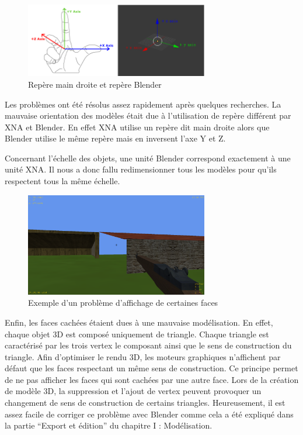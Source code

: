 \documentclass[11pt]{report}
\begin{document}
\begin{figure}[htbp]
\centering
\includegraphics[width=8cm]{repere.png}
\caption{Repère main droite et repère Blender}
\end{figure}

Les problèmes ont été résolus assez rapidement après quelques recherches. La mauvaise orientation des modèles était due à l'utilisation de repère différent par XNA et Blender. En effet XNA utilise un repère dit main droite alors que Blender utilise le même repère mais en inversent l'axe Y et Z.

Concernant l’échelle des objets, une unité Blender correspond exactement à une unité XNA. Il nous a donc fallu redimensionner tous les modèles pour qu'ils respectent tous la même échelle.

\begin{figure}[htbp]
\centering
\includegraphics[width=8cm]{bug-affichage.png}
\caption{Exemple d'un problème d'affichage de certaines faces}
\end{figure}

Enfin, les faces cachées étaient dues à une mauvaise modélisation. En effet, chaque objet 3D est composé uniquement de triangle. Chaque triangle est caractérisé par les trois vertex le composant ainsi que le sens de construction du triangle. Afin d'optimiser le rendu 3D, les moteurs graphiques n'affichent par défaut que les faces respectant un même sens de construction. Ce principe permet de ne pas afficher les faces qui sont cachées par une autre face. Lors de la création de modèle 3D, la suppression et l'ajout de vertex peuvent provoquer un changement de sens de construction de certains triangles. Heureusement, il est assez facile de corriger ce problème avec Blender comme cela a été expliqué dans la partie ``Export et édition'' du chapitre I : Modélisation.
\end{document}
